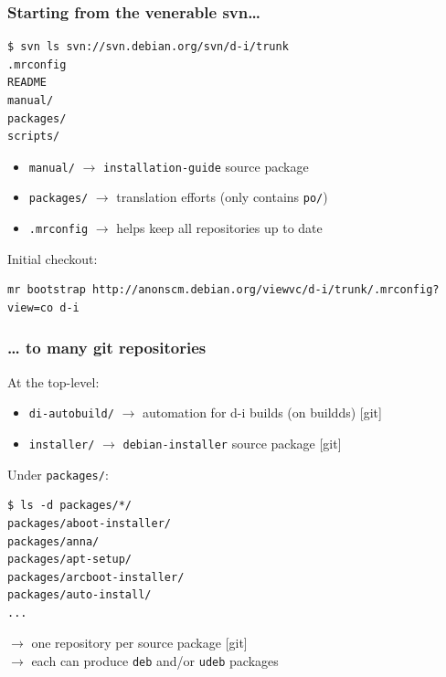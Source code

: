 \documentclass[handout]{beamer}
\begin{document}
\begin{frame}[fragile]
  \frametitle{Starting from the venerable svn…}

\begin{lstlisting}
$ svn ls svn://svn.debian.org/svn/d-i/trunk
.mrconfig
README
manual/
packages/
scripts/
\end{lstlisting}%

\begin{itemize}
\item \texttt{manual/} $\rightarrow$ \texttt{installation-guide} source package
\item \texttt{packages/} $\rightarrow$ translation efforts (only contains \texttt{po/})
\item \texttt{.mrconfig} $\rightarrow$ helps keep all repositories up to date
\end{itemize}

\vspace{1em}

Initial checkout:
\begin{lstlisting}[basicstyle=\tiny]
mr bootstrap http://anonscm.debian.org/viewvc/d-i/trunk/.mrconfig?view=co d-i
\end{lstlisting}
\end{frame}


\begin{frame}[fragile]
  \frametitle{… to many git repositories}

At the top-level:

\begin{itemize}
\item \texttt{di-autobuild/} $\rightarrow$ automation for d-i builds (on buildds) [git]
\item \texttt{installer/} $\rightarrow$ \texttt{debian-installer} source package [git]
\end{itemize}

\vspace{1em}

Under \texttt{packages/}:

\begin{lstlisting}
$ ls -d packages/*/
packages/aboot-installer/
packages/anna/
packages/apt-setup/
packages/arcboot-installer/
packages/auto-install/
...
\end{lstlisting}%

$\rightarrow$ one repository per source package [git]\\
$\rightarrow$ each can produce \texttt{deb} and/or \texttt{udeb} packages
\end{frame}
\end{document}
